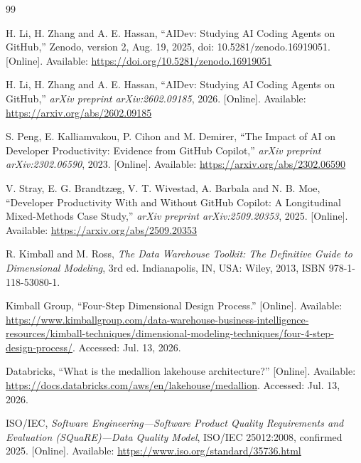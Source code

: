 \documentclass[12pt,a4paper]{article}
\begin{document}
\renewcommand{\refname}{Bibliografía}
\begin{thebibliography}{99}

H. Li, H. Zhang and A. E. Hassan, ``AIDev: Studying AI Coding Agents on GitHub,'' Zenodo, version 2, Aug. 19, 2025, doi: 10.5281/zenodo.16919051. [Online]. Available: \url{https://doi.org/10.5281/zenodo.16919051}

H. Li, H. Zhang and A. E. Hassan, ``AIDev: Studying AI Coding Agents on GitHub,'' \emph{arXiv preprint arXiv:2602.09185}, 2026. [Online]. Available: \url{https://arxiv.org/abs/2602.09185}

S. Peng, E. Kalliamvakou, P. Cihon and M. Demirer, ``The Impact of AI on Developer Productivity: Evidence from GitHub Copilot,'' \emph{arXiv preprint arXiv:2302.06590}, 2023. [Online]. Available: \url{https://arxiv.org/abs/2302.06590}

V. Stray, E. G. Brandtzæg, V. T. Wivestad, A. Barbala and N. B. Moe, ``Developer Productivity With and Without GitHub Copilot: A Longitudinal Mixed-Methods Case Study,'' \emph{arXiv preprint arXiv:2509.20353}, 2025. [Online]. Available: \url{https://arxiv.org/abs/2509.20353}

R. Kimball and M. Ross, \emph{The Data Warehouse Toolkit: The Definitive Guide to Dimensional Modeling}, 3rd ed. Indianapolis, IN, USA: Wiley, 2013, ISBN 978-1-118-53080-1.

Kimball Group, ``Four-Step Dimensional Design Process.'' [Online]. Available: \url{https://www.kimballgroup.com/data-warehouse-business-intelligence-resources/kimball-techniques/dimensional-modeling-techniques/four-4-step-design-process/}. Accessed: Jul. 13, 2026.

Databricks, ``What is the medallion lakehouse architecture?'' [Online]. Available: \url{https://docs.databricks.com/aws/en/lakehouse/medallion}. Accessed: Jul. 13, 2026.

ISO/IEC, \emph{Software Engineering---Software Product Quality Requirements and Evaluation (SQuaRE)---Data Quality Model}, ISO/IEC 25012:2008, confirmed 2025. [Online]. Available: \url{https://www.iso.org/standard/35736.html}


\end{thebibliography}
\end{document}
